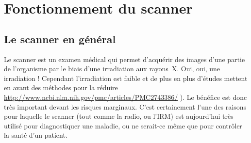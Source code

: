 \documentclass[main.tex]{subfiles}
\begin{document}
%

\section{Fonctionnement du scanner \label{sec:fct_scan}}
\subsection{Le scanner en général}
Le scanner est un examen médical qui permet d'acquérir des images d'une partie de l'organisme par le biais d'une irradiation aux rayons~X. Oui, oui, une irradiation ! Cependant l'irradiation est faible et de plus en plus d'études mettent en avant des méthodes pour la réduire  \url{http://www.ncbi.nlm.nih.gov/pmc/articles/PMC2743386/} ). Le bénéfice est donc très important devant les risques marginaux. C'est certainement l'une des raisons pour laquelle le scanner (tout comme la radio, ou l'IRM) est aujourd'hui très utilisé pour diagnostiquer une maladie, ou ne serait-ce même que pour contrôler la santé d'un patient.
\end{document}
